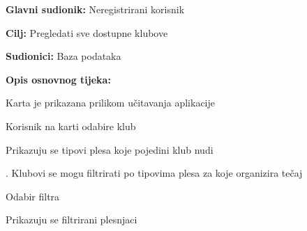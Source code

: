 					\noindent {}
					\begin{packed_item}
	
						\item \textbf{Glavni sudionik: }Neregistrirani korisnik
						\item  \textbf{Cilj:} Pregledati sve dostupne klubove
						\item  \textbf{Sudionici:} Baza podataka
						\item  \textbf{Opis osnovnog tijeka:						
						}
						
						\item[] \begin{packed_enum}
	
							\item Karta je prikazana prilikom učitavanja aplikacije
							\item Korisnik na karti odabire klub
							\item Prikazuju se tipovi plesa koje pojedini klub nudi
							\item . Klubovi se mogu filtrirati po tipovima plesa za koje organizira 
tečaj
							\item Odabir filtra
							\item Prikazuju se filtrirani plesnjaci
							
						\end{packed_enum}
						
						
					\end{packed_item}
					
